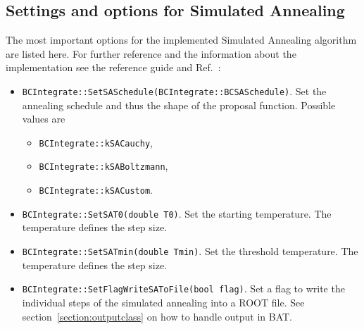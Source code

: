 \documentclass[11pt, a4paper]{article}
\begin{document}
\subsection{Settings and options for Simulated Annealing}
\label{section:settings:SA}

The most important options for the implemented Simulated Annealing
algorithm are listed here. For further reference and the information
about the implementation see the reference guide and Ref.~\cite{Brachem2009}:
%
\begin{itemize}
\item
  \verb|BCIntegrate::SetSASchedule(BCIntegrate::BCSASchedule)|. Set
  the annealing schedule and thus the shape of the proposal
  function. Possible values are
\begin{itemize}
\item \verb|BCIntegrate::kSACauchy|,
\item \verb|BCIntegrate::kSABoltzmann|,
\item \verb|BCIntegrate::kSACustom|.
\end{itemize}
\item \verb|BCIntegrate::SetSAT0(double T0)|. Set the starting
  temperature. The temperature defines the step size.
\item \verb|BCIntegrate::SetSATmin(double Tmin)|. Set the threshold
  temperature. The temperature defines the step size.
\item \verb|BCIntegrate::SetFlagWriteSAToFile(bool flag)|. Set a flag to
 write the individual steps of the simulated annealing into a ROOT
 file. See section~\ref{section:outputclass} on how to handle output in
 BAT.
\end{itemize}





\end{document}

